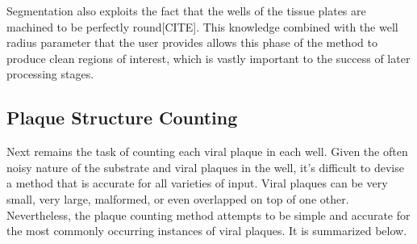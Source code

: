 \documentclass[11pt,final,twocolumn]{IEEEtran}
\begin{document}
Segmentation also exploits the fact that the wells of the tissue plates are machined to be perfectly round[CITE]. This knowledge combined with the well radius parameter that the user provides allows this phase of the method to produce clean regions of interest, which is vastly important to the success of later processing stages.

\subsection{Plaque Structure Counting}
Next remains the task of counting each viral plaque in each well. Given the often noisy nature of the substrate and viral plaques in the well, it’s difficult to devise a method that is accurate for all varieties of input. Viral plaques can be very small, very large, malformed, or even overlapped on top of one other. Nevertheless, the plaque counting method attempts to be simple and accurate for the most commonly occurring instances of viral plaques. It is summarized below.  
\end{document}
